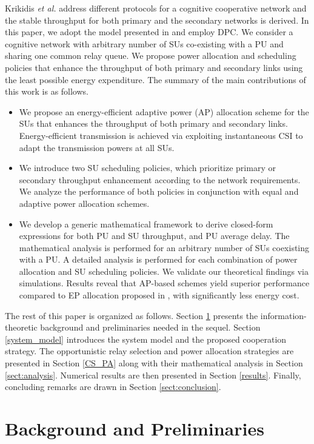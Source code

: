 \documentclass[journal,twocolumn]{IEEEtran}
\begin{document}
Krikidis \emph{et al.} address different protocols for a cognitive cooperative network and the stable throughput for both primary and the secondary networks is derived. In this paper, we adopt the model presented in \cite{Krikidis} and employ DPC. We consider a cognitive network with arbitrary number of SUs co-existing with a PU and sharing one common relay queue. We propose power allocation and scheduling policies that enhance the throughput of both primary and secondary links using the least possible energy expenditure. The summary of the main contributions of this work is as follows.
\begin{itemize}
  \item We propose an energy-efficient adaptive power (AP) allocation scheme for the SUs that enhances the throughput of both primary and secondary links. Energy-efficient transmission is achieved via exploiting instantaneous CSI to adapt the transmission powers at all SUs.
  \item We introduce two SU scheduling policies, which prioritize primary or secondary throughput enhancement according to the network requirements. We analyze the performance of both policies in conjunction with equal and adaptive power allocation schemes.     
  \item We develop a generic mathematical framework to derive closed-form expressions for both PU and SU throughput, and PU average delay. The mathematical analysis is performed for an arbitrary number of SUs coexisting with a PU. A detailed analysis is performed for each combination of power allocation and SU scheduling policies. 
We validate our theoretical findings via simulations. 
Results reveal that AP-based schemes yield superior performance compared to EP allocation proposed in \cite{Krikidis}, with significantly less energy cost. 
\end{itemize}


The rest of this paper is organized as follows. Section \ref{background} presents the information-theoretic background and preliminaries needed in
the sequel. Section \ref{system_model} introduces the system model and the proposed cooperation strategy. The opportunistic relay selection and power allocation strategies are presented in Section \ref{CS_PA} along with their mathematical analysis in Section \ref{sect:analysis}.
Numerical results are then presented in Section \ref{results}. Finally, concluding remarks are drawn in Section \ref{sect:conclusion}.

\section{Background and Preliminaries}\label{background}
\end{document}
